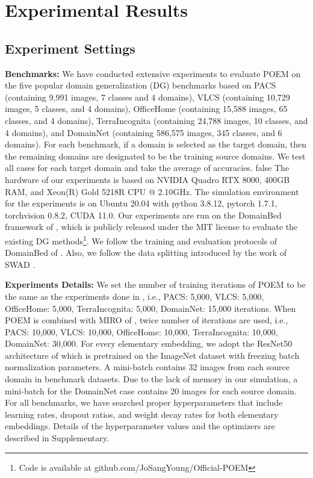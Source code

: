 \documentclass[letterpaper]{article} \usepackage{aaai23}  \usepackage{times}  \usepackage{helvet}  \usepackage{courier}  \usepackage[hyphens]{url}  \usepackage{graphicx} \urlstyle{rm} \def\UrlFont{\rm}  \usepackage{natbib}  \usepackage{caption} \frenchspacing  \setlength{\pdfpagewidth}{8.5in}  \setlength{\pdfpageheight}{11in}  \usepackage[labelsep=period]{caption}
\begin{document}
\fi


\section{Experimental Results}
\subsection{Experiment Settings}
\textbf{Benchmarks:} We have conducted extensive experiments to evaluate POEM on the five popular domain generalization (DG) benchmarks based on PACS \cite{PACS} (containing 9,991 images, 7 classes and 4 domains), VLCS \cite{VLCS} (containing 10,729 images, 5 classes, and 4 domains), OfficeHome \cite{officehome} (containing 15,588 images, 65 classes, and 4 domains), TerraIncognita \cite{terraincognita} (containing 24,788 images, 10 classes, and 4 domains), and DomainNet \cite{DomainNet} (containing 586,575 images, 345 classes, and 6 domains). 
For each benchmark, if a domain is selected as the target domain, then the remaining domains are designated to be the training source domains. 
We test all cases for each target domain and take the average of accuracies.
\if false
The hardware of our experiments is based on NVIDIA Quadro RTX 8000, 400GB RAM, and Xeon(R) Gold 5218R CPU @ 2.10GHz. The simulation environment for the experiments is on Ubuntu 20.04 with python 3.8.12, pytorch 1.7.1, torchvision 0.8.2, CUDA 11.0. 
\fi
Our experiments are run on the DomainBed framework of \cite{Domainbed}, which is publicly released under the MIT license to evaluate the existing DG methods\footnote{Code is available at github.com/JoSangYoung/Official-POEM}.
We follow the training and evaluation protocols of DomainBed of \cite{Domainbed}.
Also, we follow the data splitting introduced by the work of SWAD \cite{SWAD}. 

\textbf{Experiments Details:} We set the number of training iterations of POEM to be the same as the experiments done in \cite{SWAD}, i.e., PACS: 5,000, VLCS: 5,000, OfficeHome: 5,000, TerraIncognita: 5,000, DomainNet: 15,000 iterations.
When POEM is combined with MIRO of \cite{MIRO}, twice number of iterations are used, i.e., PACS: 10,000, VLCS: 10,000, OfficeHome: 10,000, TerraIncognita: 10,000, DomainNet: 30,000. 
For every elementary embedding, we adopt the ResNet50 architecture of \cite{resnet50} which is pretrained on the ImageNet dataset \cite{ImageNet} with freezing batch normalization parameters.
A mini-batch contains 32 images from each source domain in benchmark datasets. 
Due to the lack of memory in our simulation, a mini-batch for the DomainNet case contains 20 images for each source domain.
For all benchmarks, we have searched proper hyperparameters that include learning rates, dropout ratios, and weight decay rates for both elementary embeddings. 
Details of the hyperparameter values and the optimizers are described in Supplementary. 
\end{document}
